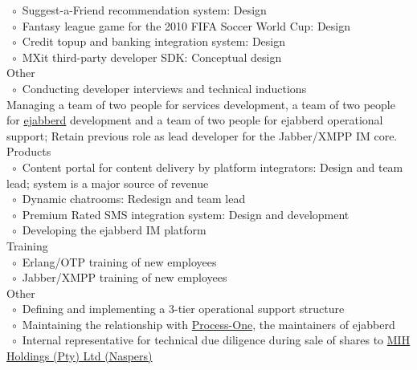 \documentclass[10pt,a4paper,final]{columncv}
\newcommand{\cvitembullet}{~$\circ$~}
\newcommand{\cvitempbullet}{\phantom{\cvitembullet}}
\begin{document}
\begin{cvenv}
{          \cvitembullet Suggest-a-Friend recommendation system: Design \\
          \cvitembullet Fantasy league game for the 2010 FIFA Soccer World Cup: Design \\
          \cvitembullet Credit topup and banking integration system: Design \\
          \cvitembullet MXit third-party developer SDK: Conceptual design \\
          Other \\
          \cvitembullet Conducting developer interviews and technical inductions \\}
         {Managing a team of two people for services development, a team of two people for 
          \href{http://www.process-one.net/en/ejabberd/}{ejabberd} development and a team 
          of two people for ejabberd operational support; 
          Retain previous role as lead developer for the Jabber/XMPP IM core.}
          {Products \\
           \cvitembullet Content portal for content delivery by platform integrators: 
           \cvitempbullet Design and team lead; system is a major source of revenue \\ 
           \cvitembullet Dynamic chatrooms: Redesign and team lead \\
           \cvitembullet Premium Rated SMS integration system: Design and development \\
           \cvitembullet Developing the ejabberd IM platform \\
           Training \\
           \cvitembullet Erlang/OTP training of new employees \\
           \cvitembullet Jabber/XMPP training of new employees \\
           Other \\
           \cvitembullet Defining and implementing a 3-tier operational support structure \\
           \cvitembullet Maintaining the relationship with 
                    \href{http://www.process-one.net/en/}{Process-One}, the maintainers  
           \cvitempbullet of ejabberd \\
           \cvitembullet Internal representative for technical due diligence during sale of 
           \cvitempbullet shares to \href{http://www.naspers.com/}{MIH Holdings (Pty) Ltd (Naspers)}}
\end{cvenv}
\end{document}
